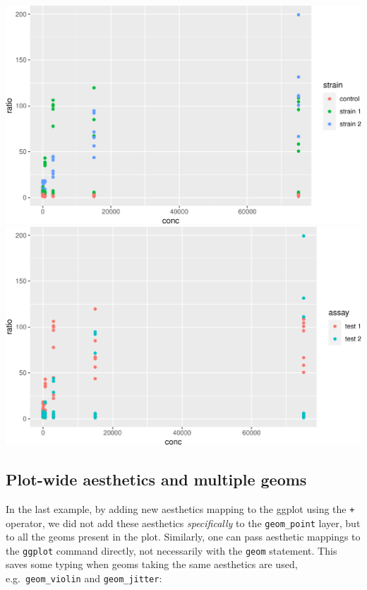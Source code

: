 \documentclass[]{book}
\begin{document}
\begin{center}\includegraphics[width=\textwidth]{TRES-Tidy-Tutorial_files/figure-latex/unnamed-chunk-120-1} \includegraphics[width=\textwidth]{TRES-Tidy-Tutorial_files/figure-latex/unnamed-chunk-120-2} \end{center}

\hypertarget{plot-wide-aesthetics-and-multiple-geoms}{%
\subsection{Plot-wide aesthetics and multiple geoms}\label{plot-wide-aesthetics-and-multiple-geoms}}

In the last example, by adding new aesthetics mapping to the ggplot using the \texttt{+} operator, we did not add these aesthetics \emph{specifically} to the \texttt{geom\_point} layer, but to all the geoms present in the plot. Similarly, one can pass aesthetic mappings to the \texttt{ggplot} command directly, not necessarily with the \texttt{geom} statement. This saves some typing when geoms taking the same aesthetics are used, e.g.~\texttt{geom\_violin} and \texttt{geom\_jitter}:
\end{document}
